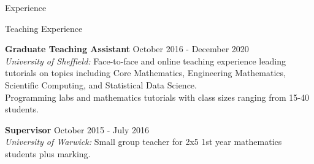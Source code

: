 \documentclass{resume} %
\begin{document}
\begin{rSection}{Experience}

\end{rSection}


\begin{rSection}{Teaching Experience}
	
	{\bf Graduate Teaching Assistant} \hfill October 2016 - December 2020 \\
	{\em University of Sheffield:} Face-to-face and online teaching experience leading tutorials on topics including Core Mathematics, Engineering Mathematics, Scientific Computing, and Statistical Data Science. \\
	Programming labs and mathematics tutorials with class sizes ranging from 15-40 students.
	
	{\bf Supervisor} \hfill October 2015 - July 2016 \\
	{\em University of Warwick:} Small group teacher for 2x5 1st year mathematics students plus marking. \\
	
	
\end{rSection}
\end{document}
